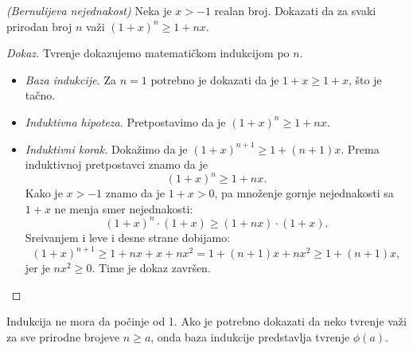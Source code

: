 
\begin{EX} \textit{(Bernulijeva nejednakost)}
  Neka je $x > -1$ realan broj. Dokazati da za svaki prirodan broj $n$ va\v zi
  $(1 + x)^n \ge 1 + nx$.
\end{EX}
\begin{proof}[Dokaz]
  Tvr\dj enje dokazujemo matemati\v ckom indukcijom po $n$.
  \begin{itemize}\itemsep -1pt
  \item
    \emph{Baza indukcije.} Za $n = 1$ potrebno je dokazati da je $1 + x \ge 1 + x$, \v sto je ta\v cno.
  \item
    \emph{Induktivna hipoteza.} Pretpostavimo da je $(1 + x)^n \ge 1 + nx$.
  \item
    \emph{Induktivni korak.} Doka\v zimo da je $(1 + x)^{n + 1} \ge 1 + (n + 1)x$. Prema induktivnoj pretpostavci znamo da je
    $$
      (1 + x)^n \ge 1 + nx.
    $$
    Kako je $x > -1$ znamo da je $1 + x > 0$, pa mno\v zenje gornje nejednakosti sa $1 + x$ ne menja smer nejednakosti:
    $$
      (1 + x)^n \cdot (1 + x) \ge (1 + nx) \cdot (1 + x).
    $$
    Sre\dj ivanjem i leve i desne strane dobijamo:
    $$
      (1 + x)^{n + 1} \ge 1 + nx + x + nx^2 = 1 + (n + 1)x + nx^2 \ge 1 + (n + 1)x,
    $$
    jer je $nx^2 \ge 0$. Time je dokaz zavr\v sen.\qedhere
  \end{itemize}
\end{proof}

Indukcija ne mora da po\v cinje od 1. Ako je potrebno dokazati da neko tvr\dj enje va\v zi za sve prirodne brojeve $n \ge a$,
onda baza indukcije predstavlja tvr\dj enje $\phi(a)$.

